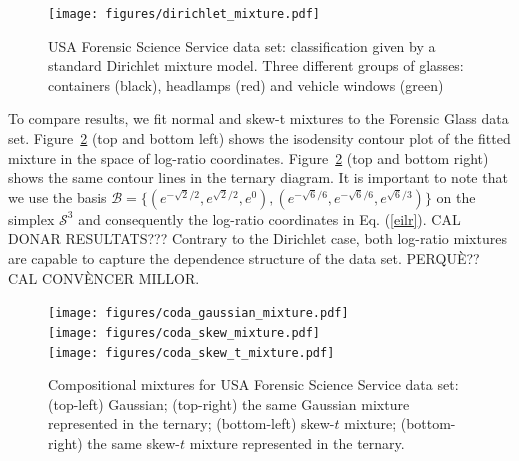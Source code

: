 \documentclass[10pt, a4paper]{article}
\begin{document}
\begin{figure}[htbp]
\centering
\texttt{[image: figures/dirichlet\_mixture.pdf]}
\caption{USA Forensic Science Service data set: classification given by a standard Dirichlet mixture model. Three different groups of glasses: containers (black), headlamps (red) and vehicle windows (green)}
\label{fig06fittingdirichlet}
\end{figure}

To compare results, we fit normal and skew-t mixtures to the Forensic Glass data set. Figure~\ref{fig07fittingcodaGaussian} (top and bottom left) shows the isodensity contour plot of the fitted mixture in the space of log-ratio coordinates. Figure~\ref{fig07fittingcodaGaussian} (top and bottom right) shows the same contour lines in the ternary diagram.  It is important to note that we use the basis $\mathcal{B} = \{ (e^{-\sqrt{2}/2}, e^{\sqrt{2}/2}, e^{0}), (e^{-\sqrt{6}/6}, e^{-\sqrt{6}/6}, e^{\sqrt{6}/3}) \}$ on the simplex $\mathcal{S}^3$ and consequently the log-ratio coordinates in Eq. (\ref{eilr}). CAL DONAR RESULTATS??? Contrary to the Dirichlet case, both log-ratio mixtures are capable to capture the dependence structure of the data set. PERQU\`{E}?? CAL CONV\`{E}NCER MILLOR.


\begin{figure}[htbp]
\centering
\texttt{[image: figures/coda\_gaussian\_mixture.pdf]}\\%
\texttt{[image: figures/coda\_skew\_mixture.pdf]}\\%
\texttt{[image: figures/coda\_skew\_t\_mixture.pdf]}%
\caption{Compositional mixtures for USA Forensic Science Service data set: (top-left) Gaussian; (top-right) the same Gaussian mixture represented in the ternary; (bottom-left) skew-$t$ mixture; (bottom-right) the same skew-$t$ mixture represented in the ternary. }
\label{fig07fittingcodaGaussian}
\end{figure}
\end{document}
